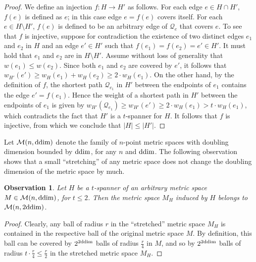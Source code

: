 \documentclass[11pt,letterpaper]{article}
\newtheorem{observation}[lemma]{Observation}
\newcommand{\ddim}{{\rm ddim}}
\begin{document}
\begin{proof}
	We define an injection $f:H\rightarrow H'$ as follows. For each edge $e\in H \cap H'$, $f(e)$ is defined as $e$; in this case edge $e = f(e)$ covers itself.
	For each $e \in H \setminus H'$, $f(e)$ is defined to be an arbitrary edge of $\mathcal{Q}_{e}$ that covers $e$.
	To see that $f$ is injective, suppose for contradiction the existence of two distinct edges $e_{1}$ and $e_{2}$ in $H$
	and an edge $e' \in H'$	such that $f(e_{1})=f(e_{2})= e' \in H'$. It must hold that $e_1$ and $e_2$ are in $H \setminus H'$.
	Assume without loss of generality that $w(e_{1})\le w(e_{2})$.
	Since both $e_{1}$ and $e_{2}$ are covered by $e'$, it follows that $w_{H'}(e')\ge w_{H}(e_{1})+w_{H}(e_{2})\ge2\cdot w_{H}(e_{1})$.
	On the other hand, by the definition of $f$, the shortest path $\mathcal{Q}_{e_1}$ in $H'$ between the endpoints of $e_{1}$ contains the edge $e' = f(e_1)$.
	Hence the weight of a shortest path in $H'$ between the endpoints of $e_1$ is given by $w_{H'}(\mathcal{Q}_{e_1}) \ge w_{H'}(e') \ge2\cdot w_{H}(e_{1})>t\cdot w_{H}(e_{1})$, which contradicts	the fact that $H'$ is a $t$-spanner for $H$. It follows that $f$ is injective, from which we conclude that  $|H|\le|H'|$.
\end{proof}

Let $\mathcal{M}(n,\ddim)$ denote the family of $n$-point metric spaces with doubling dimension bounded by $\ddim$,
for any $n$ and $\ddim$.
The following observation shows that a small ``stretching'' of any metric space does not change the doubling dimension of the metric space by much.
\begin{observation}\label{lem:doubling_embedding}
	Let $H$ be a $t$-spanner of an arbitrary metric space $M \in \mathcal{M}(n,\ddim)$, for $t\le 2$.
	Then the metric space $M_H$ induced by $H$ belongs to $\mathcal{M}(n,2\ddim)$.
\end{observation}
\begin{proof}
	Clearly, any ball of radius $r$ in the ``stretched'' metric space $M_{H}$ is contained in the respective ball of the original metric space $M$.
	By definition, this ball can be covered by $2^{2\ddim}$ balls of radius $\frac{r}{4}$ in $M$,
	and so by $2^{2\ddim}$ balls of radius $t\cdot\frac{r}{4}\le\frac{r}{2}$ in the stretched metric space $M_H$.
\end{proof}	
\end{document}
